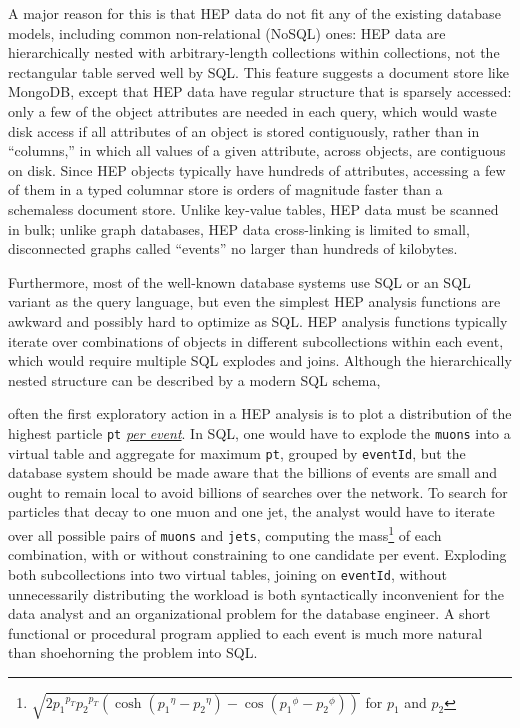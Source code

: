 \documentclass[10pt, conference, compsocconf]{IEEEtran}
\begin{document}
A major reason for this is that HEP data do not fit any of the existing database models, including common non-relational (NoSQL) ones: HEP data are hierarchically nested with arbitrary-length collections within collections, not the rectangular table served well by SQL. This feature suggests a document store like MongoDB\cite{mongodb}, except that HEP data have regular structure that is sparsely accessed: only a few of the object attributes are needed in each query, which would waste disk access if all attributes of an object is stored contiguously, rather than in ``columns,'' in which all values of a given attribute, across objects, are contiguous on disk. Since HEP objects typically have hundreds of attributes, accessing a few of them in a typed columnar store is orders of magnitude faster than a schemaless document store. Unlike key-value tables, HEP data must be scanned in bulk; unlike graph databases, HEP data cross-linking is limited to small, disconnected graphs called ``events'' no larger than hundreds of kilobytes.

Furthermore, most of the well-known database systems use SQL or an SQL variant as the query language, but even the simplest HEP analysis functions are awkward and possibly hard to optimize as SQL. HEP analysis functions typically iterate over combinations of objects in different subcollections within each event, which would require multiple SQL explodes and joins. Although the hierarchically nested structure can be described by a modern SQL schema,

\vspace{0.15 cm}



\vspace{0.15 cm}
\noindent often the first exploratory action in a HEP analysis is to plot a distribution of the highest particle {\tt pt} \underline{\it per event}. In SQL, one would have to explode the {\tt muons} into a virtual table and aggregate for maximum {\tt pt}, grouped by {\tt eventId}, but the database system should be made aware that the billions of events are small and ought to remain local to avoid billions of searches over the network. To search for particles that decay to one muon and one jet, the analyst would have to iterate over all possible pairs of {\tt muons} and {\tt jets}, computing the mass\footnote{$\sqrt{2 {p_1}^{p_T} {p_2}^{p_T} (\cosh({p_1}^\eta - {p_2}^\eta) - \cos({p_1}^\phi - {p_2}^\phi))}$ for $p_1$ and $p_2$} of each combination, with or without constraining to one candidate per event. Exploding both subcollections into two virtual tables, joining on {\tt eventId}, without unnecessarily distributing the workload is both syntactically inconvenient for the data analyst and an organizational problem for the database engineer. A short functional or procedural program applied to each event is much more natural than shoehorning the problem into SQL.
\end{document}
